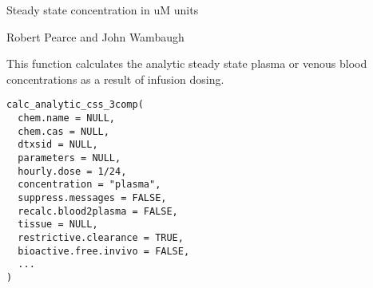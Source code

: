 \documentclass[a4paper]{book}
\begin{document}
%
\begin{Value}
Steady state concentration in uM units
\end{Value}
%
\begin{Author}\relax
Robert Pearce and John Wambaugh
\end{Author}
%
\begin{Description}\relax
This function calculates the analytic steady state plasma or venous blood 
concentrations as a result of infusion dosing.
\end{Description}
%
\begin{Usage}
\begin{verbatim}
calc_analytic_css_3comp(
  chem.name = NULL,
  chem.cas = NULL,
  dtxsid = NULL,
  parameters = NULL,
  hourly.dose = 1/24,
  concentration = "plasma",
  suppress.messages = FALSE,
  recalc.blood2plasma = FALSE,
  tissue = NULL,
  restrictive.clearance = TRUE,
  bioactive.free.invivo = FALSE,
  ...
)
\end{verbatim}
\end{Usage}
%
\end{document}
